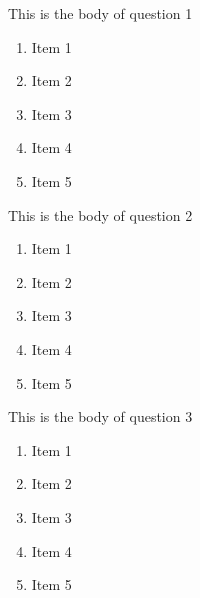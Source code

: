 \documentclass{article}
\begin{document}
This is the body of question 1
\begin{enumerate}
    \item Item 1
    \item Item 2
    \item Item 3
    \item Item 4
    \item Item 5
\end{enumerate}



This is the body of question 2
\begin{enumerate}
    \item Item 1
    \item Item 2
    \item Item 3
    \item Item 4
    \item Item 5
\end{enumerate}


This is the body of question 3
\begin{enumerate}
    \item Item 1
    \item Item 2
    \item Item 3
    \item Item 4
    \item Item 5
\end{enumerate}
\end{document}

